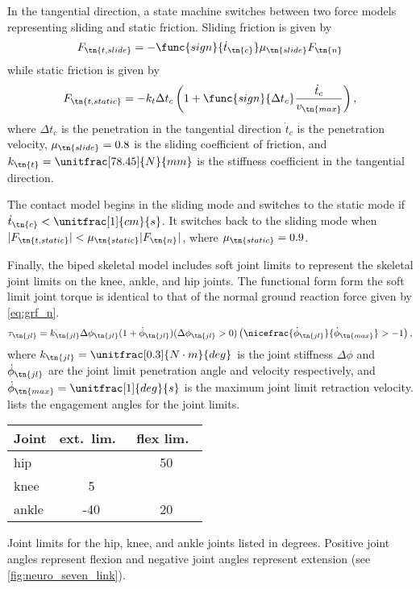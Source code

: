 In the tangential direction, a state machine switches between two force models
representing sliding and static friction. Sliding friction is given by
\begin{align}
    F_{\tn{t,slide}} = -\func{sign}{\dot t_\tn{c}} \mu_\tn{slide} F_\tn{n}
\end{align}
while static friction is given by
\begin{align}
    F_{\tn{t,static}} = -k_t \Delta t_c \left(1 + \func{sign}{\Delta t_c}
    \frac{\dot t_c}{v_\tn{max}} \right),
\end{align}
where $\Delta t_c$ is the penetration in the tangential direction $\dot t_c$ is
the penetration velocity, $\mu_\tn{slide} = 0.8$ is the sliding coefficient of
friction, and $k_\tn{t} =\unitfrac[78.45]{N}{mm}$ is the stiffness coefficient
in the tangential direction.

The contact model begins in the sliding mode and switches to the static mode if
$\dot t_\tn{c} < \unitfrac[1]{cm}{s}$. It switches back to the sliding mode when
$| F_{\tn{t,static}} | < \mu_\tn{static} | F_\tn{n} |$, where $\mu_\tn{static} =
0.9$.

Finally, the biped skeletal model includes soft joint limits to represent
the skeletal joint limits on the knee, ankle, and hip joints. The functional
form form the soft limit joint torque is identical to that of the normal ground
reaction force given by \cref{eq:grf_n}.
\begin{align}
    \tau_\tn{jl} = k_\tn{jl} \Delta \phi_\tn{jl} (1 + \dot \phi_\tn{jl}) (\Delta
    \phi_\tn{jl}  > 0) \left(\nicefrac{\dot \phi_\tn{jl}}{\dot \phi_\tn{max}} > -1
    \right), 
    \label{eq:tau_joint_limit}
\end{align}
where $k_\tn{jl} = \unitfrac[0.3]{N \cdot m}{deg}$ is the joint stiffness $\Delta
\phi$ and $\dot \phi_\tn{jl}$ are the joint limit penetration angle and
velocity respectively, and $\dot \phi_\tn{max} = \unitfrac[1]{deg}{s}$ is the
maximum joint limit retraction velocity.  lists the
engagement angles for the joint limits.
\begin{margintable}[-0.65in]
  \centering
  \small
  \begin{tabular}{lcc}
      Joint & ext.\ lim.\ & flex lim.\ \\
      \midrule
      hip   &     & 50 \\
      knee  &   5 &    \\
      ankle & -40 & 20 \\
  \end{tabular}
  \caption{Joint limits for the hip, knee, and ankle joints listed in degrees.
  Positive joint angles represent flexion and negative joint angles represent
  extension (see \cref{fig:neuro_seven_link}).}\label{tab:joint_lim}
\end{margintable}

